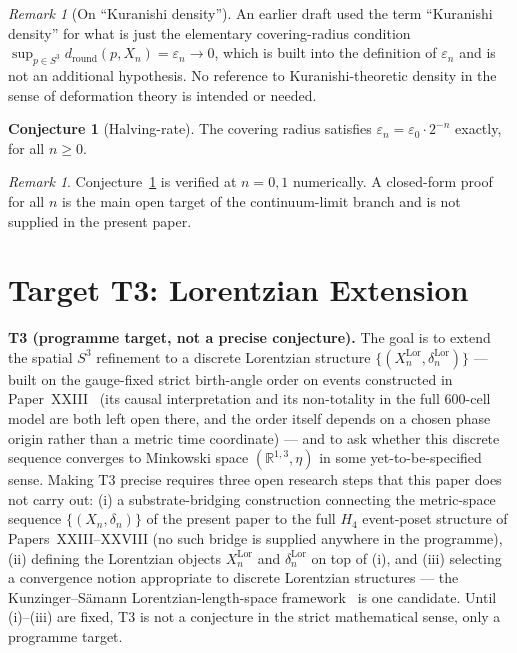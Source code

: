 \documentclass[12pt]{article}
\theoremstyle{definition}
\newtheorem{conjecture}[theorem]{Conjecture}
\theoremstyle{remark}
\newtheorem{remark}[theorem]{Remark}
\begin{document}
\begin{remark}[On ``Kuranishi density'']
An earlier draft used the term ``Kuranishi density'' for what is just the elementary covering-radius condition $\sup_{p \in S^3} d_{\mathrm{round}}(p, X_n) = \varepsilon_n \to 0$, which is built into the definition of $\varepsilon_n$ and is not an additional hypothesis. No reference to Kuranishi-theoretic density in the sense of deformation theory is intended or needed.
\end{remark}

\begin{conjecture}[Halving-rate]\label{conj:halving}
The covering radius satisfies $\varepsilon_n = \varepsilon_0 \cdot 2^{-n}$ exactly, for all $n \ge 0$.
\end{conjecture}

\begin{remark}
Conjecture~\ref{conj:halving} is verified at $n = 0, 1$ numerically. A closed-form proof for all $n$ is the main open target of the continuum-limit branch and is not supplied in the present paper.
\end{remark}

\section{Target T3: Lorentzian Extension}\label{sec:T3}

\textbf{T3 (programme target, \label{target:T3} not a precise conjecture).} The goal is to extend the spatial $S^3$ refinement to a discrete Lorentzian structure $\{(X_n^{\mathrm{Lor}}, \delta_n^{\mathrm{Lor}})\}$ --- built on the gauge-fixed strict birth-angle order on events constructed in Paper~XXIII~\citep{SmartXXIII} (its causal interpretation and its non-totality in the full 600-cell model are both left open there, and the order itself depends on a chosen phase origin rather than a metric time coordinate) --- and to ask whether this discrete sequence converges to Minkowski space $(\mathbb{R}^{1,3}, \eta)$ in some yet-to-be-specified sense. Making T3 precise requires three open research steps that this paper does not carry out: (i) a substrate-bridging construction connecting the metric-space sequence $\{(X_n, \delta_n)\}$ of the present paper to the full $H_4$ event-poset structure of Papers~XXIII--XXVIII (no such bridge is supplied anywhere in the programme), (ii) defining the Lorentzian objects $X_n^{\mathrm{Lor}}$ and $\delta_n^{\mathrm{Lor}}$ on top of (i), and (iii) selecting a convergence notion appropriate to discrete Lorentzian structures --- the Kunzinger--S\"amann Lorentzian-length-space framework~\citep{Kunzinger2018} is one candidate. Until (i)--(iii) are fixed, T3 is not a conjecture in the strict mathematical sense, only a programme target.
\end{document}
